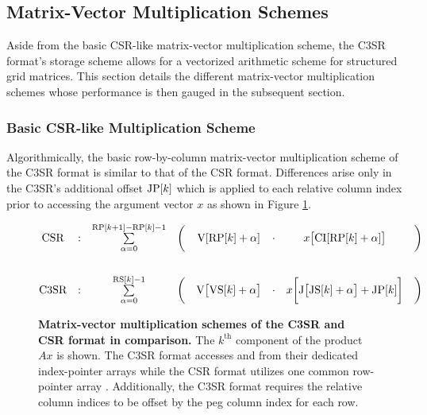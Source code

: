 \documentclass{article}
\begin{document}
  \subsection{Matrix-Vector Multiplication Schemes} \label{subsec:matrix-vector-multiplication-schemes}

    Aside from the basic CSR-like matrix-vector multiplication scheme, the C3SR format's storage scheme allows for a vectorized arithmetic scheme for structured grid matrices. This section details the different matrix-vector multiplication schemes whose performance is then gauged in the subsequent section.

    \subsubsection{Basic CSR-like Multiplication Scheme} \label{subsubsec:basic-csr-like-multiplication-scheme}

      Algorithmically, the basic row-by-column matrix-vector multiplication scheme of the C3SR format is similar to that of the CSR format. Differences arise only in the C3SR's additional offset $\JP[k]$ which is applied to each relative column index prior to accessing the argument vector $x$ as shown in Figure \ref{fig:c3sr_matvecmult_basic}.

      \begin{figure}[ht]
        \centering
        $$
        \begin{matrix}
          \text{CSR}  & : & \sum \limits_{\alpha = 0}^{\RP[k+1] - \RP[k] - 1} & \bigg( & \V[\RP[k] + \alpha]   & \cdot & x\big[\CI[\RP[k] + \alpha]\big] & \bigg)\\
          \vspace{0.3cm} \\
          \text{C3SR} & : & \sum \limits_{\alpha = 0}^{\RS[k] - 1} & \bigg( & \V\big[\VS[k] + \alpha\big] & \cdot & x\bigg[\J\big[\JS[k] + \alpha\big] + \JP[k]\bigg] & \bigg) \\
        \end{matrix}
        $$
        \caption[Matrix-vector multiplication schemes of the C3SR and CSR format in comparison.]{\textbf{Matrix-vector multiplication schemes of the C3SR and CSR format in comparison.} The $k^{\text{th}}$ component of the product $Ax$ is shown. The C3SR format accesses \V and \J from their dedicated index-pointer arrays while the CSR format utilizes one common row-pointer array \RP. Additionally, the C3SR format requires the relative column indices to be offset by the peg column index for each row.}
        \label{fig:c3sr_matvecmult_basic}
      \end{figure}
\end{document}

